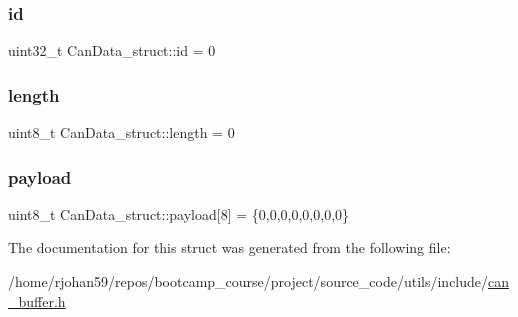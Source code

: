 \subsubsection{\texorpdfstring{id}{id}}
{\footnotesize\ttfamily uint32\+\_\+t Can\+Data\+\_\+struct\+::id = 0}

\mbox{\label{structCanData__struct_ad1ca4194a316ab04be6e24276fb20055}} 
\subsubsection{\texorpdfstring{length}{length}}
{\footnotesize\ttfamily uint8\+\_\+t Can\+Data\+\_\+struct\+::length = 0}

\mbox{\label{structCanData__struct_a0da7d3f1624043fc775968620c0be651}} 
\subsubsection{\texorpdfstring{payload}{payload}}
{\footnotesize\ttfamily uint8\+\_\+t Can\+Data\+\_\+struct\+::payload\mbox{[}8\mbox{]} = \{0,0,0,0,0,0,0,0\}}



The documentation for this struct was generated from the following file\+:\begin{DoxyCompactItemize}
\item 
/home/rjohan59/repos/bootcamp\+\_\+course/project/source\+\_\+code/utils/include/\hyperlink{can__buffer_8h}{can\+\_\+buffer.\+h}\end{DoxyCompactItemize}
